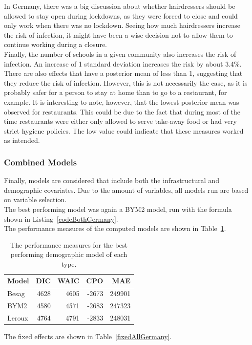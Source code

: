 In Germany, there was a big discussion about whether hairdressers should be allowed to stay open during lockdowns, as they were forced to close and could only work when there was no lockdown. Seeing how much hairdressers increase the risk of infection, it might have been a wise decision not to allow them to continue working during a closure. \\
Finally, the number of schools in a given community also increases the risk of infection. An increase of 1 standard deviation increases the risk by about 3.4\%.
\\
There are also effects that have a posterior mean of less than 1, suggesting that they reduce the risk of infection. However, this is not necessarily the case, as it is probably safer for a person to stay at home than to go to a restaurant, for example. It is interesting to note, however, that the lowest posterior mean was observed for restaurants. This could be due to the fact that during most of the time restaurants were either only allowed to serve take-away food or had very strict hygiene policies. The low value could indicate that these measures worked as intended.
\subsubsection{Combined Models}
Finally, models are considered that include both the infrastructural and demographic covariates. Due to the amount of variables, all models run are based on variable selection. \\
The best performing model was again a BYM2 model, run with the formula shown in Listing~\ref{codeBothGermany}. \\
The performance measures of the computed models are shown in Table~\ref{allGermany}.
\begin{table}[H] 
\caption{The performance measures for the best performing demographic model of each type. \label{allGermany}}
\begin{tabular}{l r r r r}
\toprule
\textbf{Model}	& \textbf{DIC}	& \textbf{WAIC} & \textbf{CPO} & \textbf{MAE}\\
\midrule
Besag&  4628 & 4605 & -2673 & 249901\\
BYM2 & 4580 & 4571 & -2683 & 247323\\
Leroux & 4764 & 4791 & -2833 & 248031 \\
\bottomrule
\end{tabular}
\end{table}
The fixed effects are shown in Table~\ref{fixedAllGermany}.


